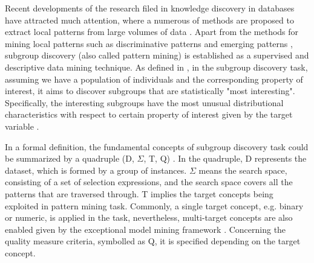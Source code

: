 Recent developments of the research filed in knowledge discovery in databases have attracted much attention, where a numerous of methods are proposed to extract local patterns from large volumes of data  \cite{fayyad1996data}. Apart from the methods for mining local patterns such as discriminative patterns \cite{cheng2008direct} and emerging patterns \cite{dong1999efficient}, subgroup discovery (also called pattern mining) is established as a supervised and descriptive data mining technique. As defined in \cite{herrera2011overview}, in the subgroup discovery task, assuming we have a population of individuals and the corresponding property of interest, it aims to discover subgroups that are statistically "most interesting". Specifically, the interesting subgroups have the most unusual distributional characteristics with respect to certain property of interest given by the target variable \cite{atzmueller2009fast}.

In a formal definition, the fundamental concepts of subgroup discovery task could be summarized by a quadruple (D, $\Sigma$, T, Q) \cite{lemmerich2014novel}. In the quadruple, D represents the dataset, which is formed by a group of instances. $\Sigma$ means the search space, consisting of a set of selection expressions, and the search space covers all the patterns that are traversed through. T implies the target concepts being exploited in pattern mining task. Commonly, a single target concept, e.g. binary or numeric, is applied in the task, nevertheless, multi-target concepts are also enabled given by the exceptional model mining framework \cite{leman2008exceptional}. Concerning the quality measure criteria, symbolled as Q, it is specified depending on the target concept. 

